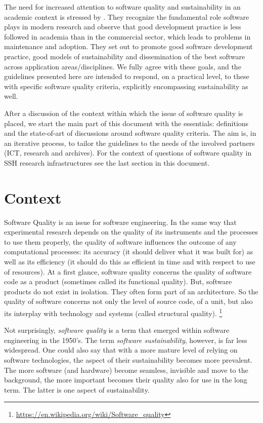 \documentclass[a4paper,11pt]{article}
\begin{document}
The need for increased attention to software quality and sustainability in an
academic context is stressed by
\cite{RESEARCHSOFTWARE}.
They recognize the fundamental role software plays in modern research and
observe that good development practice is less followed in academia than in the
commercial sector, which leads to problems in maintenance and adoption. They
set out to promote good software development practice, good models of
sustainability and dissemination of the best software across application
areas/disciplines. We fully agree with these goals, and the guidelines presented here are
intended to respond, on a practical level, to these with specific software
quality criteria, explicitly encompassing sustainability as well.

After a discussion of the context within which the issue of software quality is placed, we start the main part of this  document with the essentials: definitions and the state-of-art
of discussions around software quality criteria. The aim is, in an iterative
process, to tailor the guidelines to the needs of the involved partners (ICT,
research and archives). For the context of questions of software quality in SSH
research infrastructures see the last section in this document.

\section{Context}

Software Quality is an issue for software engineering. In the same way that
experimental research depends on the quality of its instruments and the
processes to use them properly, the quality of software influences the outcome
of any computational processes: its accuracy (it should deliver what it
was built for) as well as its efficiency (it should do this as efficient in
time and with respect to use of resources). At a first glance, software
quality concerns the quality of software code as a product (sometimes
called its functional quality). But, software products do not exist in
isolation. They often form part of an architecture. So the quality of software
concerns not only the level of source code, of a unit, but also its interplay
with technology and systems (called structural quality).
\footnote{\url{https://en.wikipedia.org/wiki/Software\_quality}}

Not surprisingly, \textit{software quality} is a term that emerged within software
engineering in the 1950's. The term \textit{software sustainability}, however, is far less widespread. One
could also say that with a more mature level of relying on software
technologies, the aspect of their sustainability becomes more prevalent. The
more software (and hardware) become seamless, invisible and move to the
background, the more important becomes their quality also for use in the long
term. The latter is one aspect of sustainability.
\end{document}
